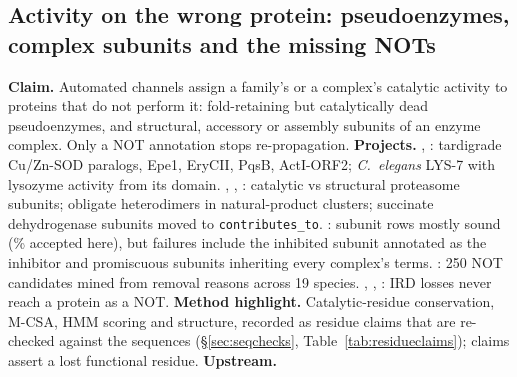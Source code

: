 \subsection{Activity on the wrong protein: pseudoenzymes, complex subunits and the missing NOTs}\label{sec:dd-pseudo}
\textbf{Claim.} Automated channels assign a family's or a complex's catalytic activity to proteins
that do not perform it: fold-retaining but catalytically dead pseudoenzymes, and structural,
accessory or assembly subunits of an enzyme complex. Only a NOT annotation stops re-propagation.
\textbf{Projects.} , : tardigrade Cu/Zn-SOD paralogs,
Epe1, EryCII, PqsB, ActI-ORF2; \textit{C.\ elegans} LYS-7 with lysozyme activity from its domain.
, , : catalytic vs
structural proteasome subunits; obligate heterodimers in natural-product clusters; succinate
dehydrogenase subunits moved to \texttt{contributes\_to}. : subunit rows mostly
sound (\accComplexPortal\% accepted here), but failures include the inhibited subunit annotated as the
inhibitor and promiscuous subunits inheriting every complex's terms.
: 250 NOT candidates mined from removal reasons across 19 species.
, , : IRD losses never
reach a protein as a NOT.
\textbf{Method highlight.} Catalytic-residue conservation, M-CSA, HMM scoring and structure, recorded as
residue claims that are re-checked against the sequences (\S\ref{sec:seqchecks}, Table~\ref{tab:residueclaims});
\nResLost{} claims assert a lost functional residue.
\textbf{Upstream.} 
